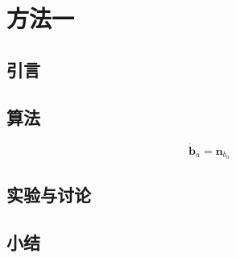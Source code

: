 \chapter{方法一}
\section{引言}
\section{算法}
    \[\dot{\bm{b}}_a = \bm{n}_{b_a}\label{eq:bias}\]
\section{实验与讨论}
\section{小结}
